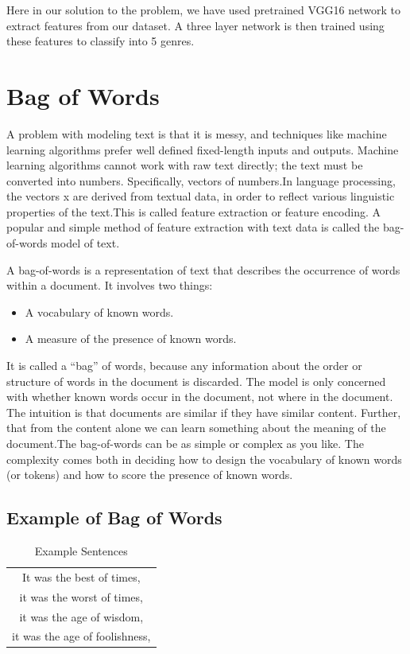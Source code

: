 \documentclass[conference]{IEEEtran}
\begin{document}
Here in our solution to the problem, we have used pretrained VGG16 network to extract features from our dataset. A three layer network is then trained using these features to classify into 5 genres.


\section{Bag of Words}

A problem with modeling text is that it is messy, and techniques like machine learning algorithms prefer well defined fixed-length inputs and outputs.
Machine learning algorithms cannot work with raw text directly; the text must be converted into numbers. Specifically, vectors of numbers.In language processing, the vectors x are derived from textual data, in order to reflect various linguistic properties of the text.This is called feature extraction or feature encoding.
A popular and simple method of feature extraction with text data is called the bag-of-words model of text.

A bag-of-words is a representation of text that describes the occurrence of words within a document. It involves two things:
\begin{itemize}
	\item A vocabulary of known words.
	\item A measure of the presence of known words.
\end{itemize}
It is called a “bag” of words, because any information about the order or structure of words in the document is discarded. The model is only concerned with whether known words occur in the document, not where in the document. 
The intuition is that documents are similar if they have similar content. Further, that from the content alone we can learn something about the meaning of the document.The bag-of-words can be as simple or complex as you like. The complexity comes both in deciding how to design the vocabulary of known words (or tokens) and how to score the presence of known words.
\subsection{Example of Bag of Words}

\begin{table}[hbtp]
\caption{Example Sentences}

\begin{center}

\begin{tabular}{|c|}

\hline
It was the best of times,\\
it was the worst of times,\\
it was the age of wisdom,\\
it was the age of foolishness,\\
\hline

\end{tabular}

\label{tab1}
\end{center}

\end{table}
\end{document}

